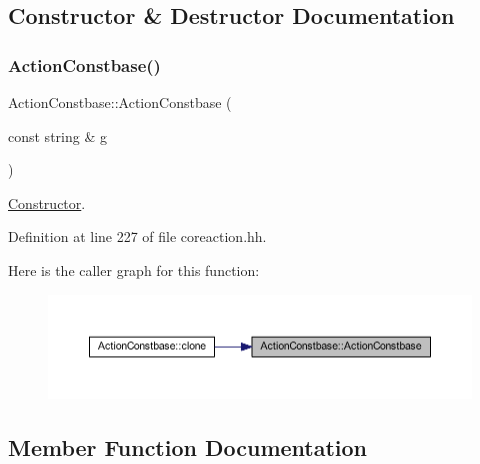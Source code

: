 \subsection{Constructor \& Destructor Documentation}
\mbox{\label{class_action_constbase_a1c7e4e0b94a6c384c929f0276d4ca025}} 
\subsubsection{\texorpdfstring{ActionConstbase()}{ActionConstbase()}}
{\footnotesize\ttfamily Action\+Constbase\+::\+Action\+Constbase (\begin{DoxyParamCaption}\item[{const string \&}]{g }\end{DoxyParamCaption})\hspace{0.3cm}{\ttfamily [inline]}}



\mbox{\hyperlink{class_constructor}{Constructor}}. 



Definition at line 227 of file coreaction.\+hh.

Here is the caller graph for this function\+:
\nopagebreak
\begin{figure}[H]
\begin{center}
\leavevmode
\includegraphics[width=350pt]{class_action_constbase_a1c7e4e0b94a6c384c929f0276d4ca025_icgraph}
\end{center}
\end{figure}


\subsection{Member Function Documentation}
\mbox{\label{class_action_constbase_acdc2434caa56bded4425c19e0b68bdfc}} 
